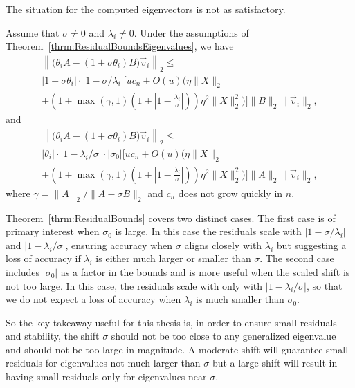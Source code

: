 The situation for the computed eigenvectors is not as satisfactory.
\begin{theorem}\label{thrm:ResidualBounds}
	Assume that $\sigma\neq 0$ and $\lambda_i\neq 0$.  Under the assumptions of Theorem~\ref{thrm:ResidualBoundsEigenvalues}, we have
	\begin{multline*}
		\left\| \big(\theta_i A - (1+\sigma \theta_i) B\big) \vec{v}_i \right\|_2
		\leq \\
		|1+\sigma \theta_i| \cdot |1-\sigma/\lambda_i| \Bigg[
		uc_n +O(u)\Bigg( \eta\|X\|_2 \\
		+ \left(1 + \max(\gamma, 1)
		\left(1+ \left| 1 - \frac{\lambda_i}{\sigma}\right|\right)\right)
		\eta^2\|X\|_2^2 \Bigg) \Bigg] \|B\|_2 \|\vec{v}_i\|_2,
	\end{multline*}
	and
	\begin{multline*}
		\left\| \big(\theta_i A - (1+\sigma \theta_i) B\big) \vec{v}_i \right\|_2
		\leq \\
		|\theta_i| \cdot |1-\lambda_i/\sigma| \cdot |\sigma_0| \Bigg[
		uc_n +O(u)\Bigg( \eta\|X\|_2 \\
		+ \left(1 + \max(\gamma, 1) \left(1+ \left| 1
		- \frac{\lambda_i}{\sigma}\right|\right)\right)
		\eta^2\|X\|_2^2 \Bigg) \Bigg] \|A\|_2 \|\vec{v}_i\|_2,
	\end{multline*}
        where $\gamma = \|A\|_2/ \|A-\sigma B\|_2$ and $c_n$ does not grow quickly in $n$.
\end{theorem}

Theorem~\ref{thrm:ResidualBounds} covers two distinct cases. The first case is of primary interest when $\sigma_0$ is large. In this case the residuals scale with $\lvert 1 - \sigma/ \lambda_i \rvert$ and $\lvert 1 - \lambda_i/\sigma\rvert$, ensuring accuracy when $\sigma$ aligns closely with $\lambda_i$ but suggesting a loss of accuracy if $\lambda_i$ is either much larger or smaller than $\sigma$. The second case includes $|\sigma_0|$ as a factor in the bounds and is more useful when the scaled shift is not too large.  In this case, the residuals scale with only with $\lvert 1 - \lambda_i/\sigma\rvert$, so that we do not expect a loss of accuracy when $\lambda_i$ is much smaller than $\sigma_0$.

So the key takeaway useful for this thesis is, in order to ensure small residuals and stability, the shift $\sigma$ should not be too close to any generalized eigenvalue and should not be too large in magnitude. A moderate shift will guarantee small residuals for eigenvalues not much larger than $\sigma$ but a large shift will result in having small residuals only for eigenvalues near $\sigma$.

